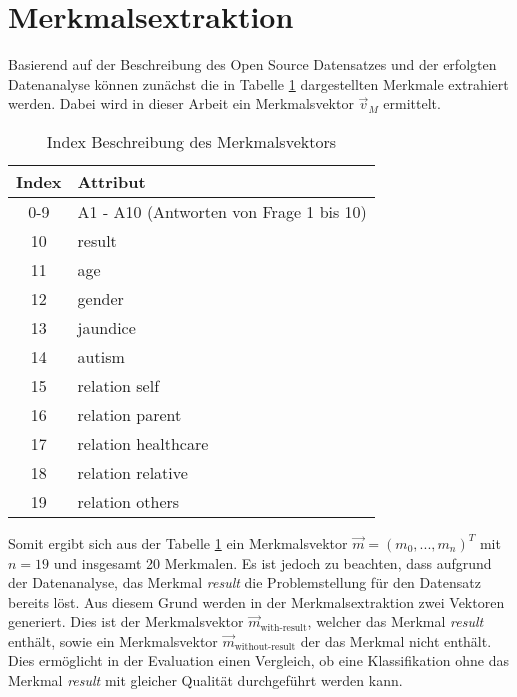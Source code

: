 \section{Merkmalsextraktion}
Basierend auf der Beschreibung des Open Source Datensatzes und der erfolgten Datenanalyse können zunächst die in Tabelle \ref{tbl:features} dargestellten Merkmale extrahiert werden. Dabei wird in dieser Arbeit ein Merkmalsvektor $\vec{v}_M$ ermittelt.

\begin{table}
\caption{Index Beschreibung des Merkmalsvektors}
\begin{tabular}{c p{5cm}}
\textbf{Index} & \textbf{Attribut} \\ \hline
0-9 & A1 - A10 (Antworten von Frage 1 bis 10)\\
10 & result\\
11 & age \\
12 & gender\\
13 & jaundice\\
14 & autism\\
15 & relation self\\
16 & relation parent\\
17 & relation healthcare\\
18 & relation relative\\
19 & relation others\\
\end{tabular}
\centering
\label{tbl:features}
\end{table}

Somit ergibt sich aus der Tabelle \ref{tbl:features} ein Merkmalsvektor $\vec{m} = (m_0, ..., m_n)^T$ mit $n = 19$ und insgesamt 20 Merkmalen. Es ist jedoch zu beachten, dass aufgrund der Datenanalyse, das Merkmal \textit{result} die Problemstellung für den Datensatz bereits löst. Aus diesem Grund werden in der Merkmalsextraktion zwei Vektoren generiert. Dies ist der Merkmalsvektor $\vec{m}_{\text{with-result}}$, welcher das Merkmal \textit{result} enthält, sowie ein Merkmalsvektor $\vec{m}_{\text{without-result}}$ der das Merkmal nicht enthält. Dies ermöglicht in der Evaluation einen Vergleich, ob eine Klassifikation ohne das Merkmal \textit{result} mit gleicher Qualität durchgeführt werden kann.
